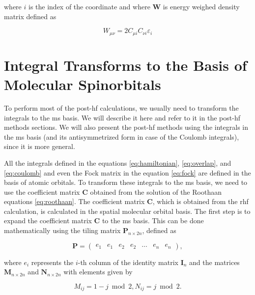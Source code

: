 where \(i\) is the index of the coordinate and where \(\mathbf{W}\) is energy weighed density matrix defined as

\begin{equation}
W_{\mu\nu}=2C_{\mu i}C_{\nu i}\varepsilon_i
\end{equation}

\section{\texorpdfstring{Integral Transforms to the Basis of Molecular Spinorbitals\label{sec:integral_transform}}{Integral Transforms to the Basis of Molecular Spinorbitals}}

To perform most of the \acrfull{post-hf} calculations, we usually need to transform the integrals to the \acrfull{ms} basis. We will describe it here and refer to it in the \acrshort{post-hf} methods sections. We will also present the \acrshort{post-hf} methods using the integrals in the \acrshort{ms} basis (and its antisymmetrized form in case of the Coulomb integrals), since it is more general.

All the integrals defined in the equations \eqref{eq:hamiltonian}, \eqref{eq:overlap}, and \eqref{eq:coulomb} and even the Fock matrix in the equation \eqref{eq:fock} are defined in the basis of atomic orbitals. To transform these integrals to the \acrshort{ms} basis, we need to use the coefficient matrix \(\mathbf{C}\) obtained from the solution of the Roothaan equations \eqref{eq:roothaan}. The coefficient matrix \(\mathbf{C}\), which is obtained from the \acrshort{rhf} calculation, is calculated in the spatial molecular orbital basis. The first step is to expand the coefficient matrix \(\mathbf{C}\) to the \acrshort{ms} basis. This can be done mathematically using the tiling matrix \(\mathbf{P}_{n\times 2n}\), defined as

\begin{equation}
\mathbf{P}=
\begin{pmatrix}
e_1&e_1&e_2&e_2&\dots&e_n&e_n
\end{pmatrix}
,
\end{equation}

where \(e_i\) represents the \(i\)-th column of the identity matrix \(\mathbf{I}_n\) and the matrices \(\mathbf{M}_{n\times 2n}\) and \(\mathbf{N}_{n\times 2n}\) with elements given by

\begin{equation}
M_{ij}=1-j\bmod 2,N_{ij}=j \bmod 2.
\end{equation}

